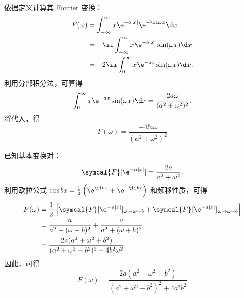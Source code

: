 \begin{solution}

    依据定义计算其 Fourier 变换：
    \begin{equation}\label{eq:p2s1-ft}
        \begin{aligned}
            F(\omega) & = \int_{-\infty}^{\infty} x\e^{-a|x|} \e^{-\ii\omega x} \d x   \\
                      & = -\ii \int_{-\infty}^{\infty} x\e^{-a|x|} \sin(\omega x) \d x \\
                      & = -2\ii \int_0^\infty x\e^{-ax} \sin(\omega x) \d x.
        \end{aligned}
    \end{equation}
    利用分部积分法，可算得
    \begin{equation}\label{eq:p2s1-int}
        \int_0^\infty x\e^{-ax} \sin(\omega x) \d x = \frac{2a\omega}{(a^2+\omega^2)^2}.
    \end{equation}
    将代入，得
    \begin{equation}
        \boxed{F(\omega) = \frac{-4\ii a\omega}{(a^2+\omega^2)^2}}
    \end{equation}


    已知基本变换对：
    \begin{equation}\label{eq:p2s2-basic}
        \symcal{F}[\e^{-a|x|}] = \frac{2a}{a^2+\omega^2}.
    \end{equation}
    利用欧拉公式 $\cos bx = \frac{1}{2}\left( \e^{\ii bx} + \e^{-\ii bx} \right)$ 和频移性质，可得
    \begin{equation}\label{eq:p2s2-shift}
        \begin{aligned}
            F(\omega) & = \frac{1}{2} \left[ \symcal{F}[\e^{-a|x|}]_{\omega \to \omega - b} + \symcal{F}[\e^{-a|x|}]_{\omega \to \omega + b} \right] \\
                      & = \frac{a}{a^2+(\omega-b)^2} + \frac{a}{a^2+(\omega+b)^2}                                                                    \\
                      & = \frac{2a(a^2+\omega^2+b^2)}{(a^2+\omega^2+b^2)^2 - 4b^2\omega^2}.
        \end{aligned}
    \end{equation}
    因此，可得
    \begin{equation}
        \boxed{F(\omega) = \frac{2a(a^2+\omega^2+b^2)}{(a^2+\omega^2-b^2)^2 + 4a^2b^2}}
    \end{equation}


\end{solution}
